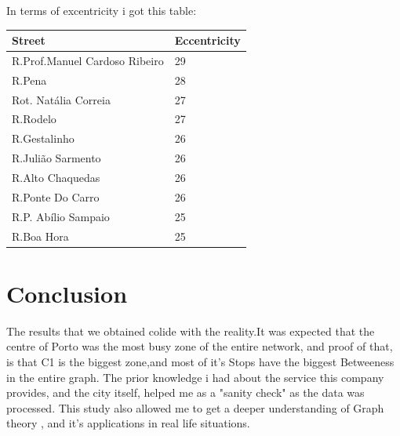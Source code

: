\documentclass[12pt]{article}
\begin{document}
\begin{multicols}{2}
\begin{center}
\begin{tabular}[h]{|l|r|}
\hline
\end{tabular}
\end{center}

In terms of excentricity i got this table:
\begin{center}
\begin{tabular}[h]{|l|l|}
\hline
Street	& Eccentricity\\
\hline
R.Prof.Manuel Cardoso Ribeiro & 29\\
R.Pena & 28\\
Rot. Natália Correia & 27\\
R.Rodelo & 27\\
R.Gestalinho & 26\\
R.Julião Sarmento &	26\\
R.Alto Chaquedas & 26\\
R.Ponte Do Carro & 26\\
R.P. Abílio Sampaio & 25\\
R.Boa Hora & 25\\
\hline
\end{tabular}
\end{center}

\section{Conclusion}
	The results that we obtained colide with the reality.It was expected that the centre of Porto was the most busy zone of the entire network, and proof of that, is that C1 is the biggest zone,and most of it's Stops have the biggest Betweeness in the entire graph. The prior knowledge i had about the service this company provides, and the city itself, helped me as a "sanity check" as the data was processed. This study also allowed me to get a deeper understanding of Graph theory , and it's applications in real life situations.

\end{multicols}	
\end{document}
